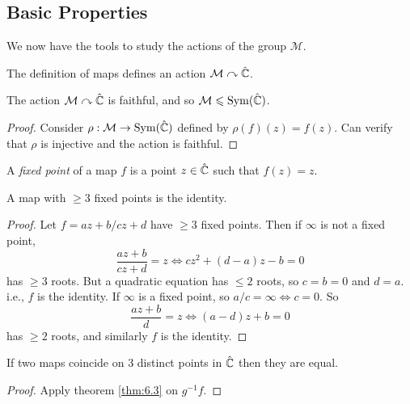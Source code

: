 \documentclass[10pt]{article}
\def\le{\leqslant}
\def\ge{\geqslant}
\DeclareMathOperator{\sym}{Sym}
\begin{document}
      \subsection{Basic Properties}
      We now have the tools to study the actions of the \mobius group $ \mathcal{M} $.
      \begin{remark}
          The definition of \mobius maps defines an action $ {\mathcal{M}} \curvearrowright \hat{\mathbb{C}} $.
      \end{remark}
      \begin{proposition}\label{prop:6.1}
          The action $ {\mathcal{M}} \curvearrowright \hat{\mathbb{C}} $ is faithful, and so $ \mcM\le \sym(\hat{\bbC}) $.
      \end{proposition}
      \begin{proof}
          Consider $ \rho: \mcM \to \sym(\hat{\bbC}) $ defined by $ \rho(f)(z)=f(z) $. Can verify that $ \rho $ is injective and the action is faithful.
      \end{proof}
      \begin{definition}
          A \textit{fixed point} of a \mobius map $f$ is a point $z\in \hat{{\mathbb{C}}}$ such that $ f(z)=z $.
      \end{definition}
      \begin{theorem}\label{thm:6.3}
          A \mobius map with $\ge 3$ fixed points is the identity.
      \end{theorem}
      \begin{proof}
          Let $ f=az+b/cz+d $ have $\ge 3$ fixed points. Then if $\infty$ is not a fixed point,
          \[
             \frac{az+b}{cz+d}=z \Longleftrightarrow cz^2+(d-a)z-b=0
          \]
          has $\ge 3$ roots. But a quadratic equation has $\le 2$ roots, so $c=b=0$ and $d=a$. i.e., $f$ is the identity.
          If $\infty$ is a fixed point, so $ a/c=\infty \Leftrightarrow c=0 $. So 
          \[
              \frac{az+b}{d}=z \Longleftrightarrow (a-d)z+b=0
          \]
          has $\ge 2$ roots, and similarly $f$ is the identity.
      \end{proof}
      \begin{corollary}\label{col:6.4}
              If two \mobius maps coincide on 3 distinct points in $ \hat{{\mathbb{C}}} $ then they are equal.
      \end{corollary}
      \begin{proof}
          Apply theorem \ref{thm:6.3} on $g^{-1}f$.
      \end{proof}
\end{document}
